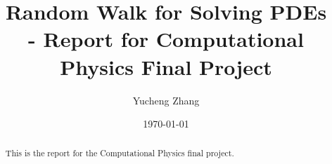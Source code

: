 \documentclass[aps, prl, reprint, groupedaddress]{revtex4-1}
\begin{document}
    
\title{Random Walk for Solving PDEs\\- Report for Computational Physics Final Project}
\author{Yucheng Zhang}
\date{\today}
    
\begin{abstract}
    This is the report for the Computational Physics final project.
\end{abstract}
    
\maketitle




\end{document}
